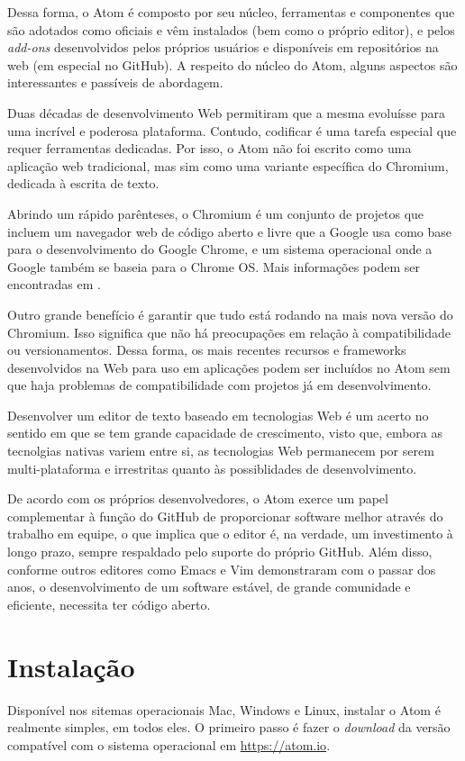 	Dessa forma, o Atom é composto por seu núcleo, ferramentas e componentes que são adotados como oficiais e vêm instalados (bem como o próprio editor), e pelos \textit{add-ons} desenvolvidos pelos próprios usuários e disponíveis em repositórios na web (em especial no GitHub). A respeito do núcleo do Atom, alguns aspectos são interessantes e passíveis de abordagem.

	Duas décadas de desenvolvimento Web permitiram que a mesma evoluísse para uma incrível e poderosa plataforma. Contudo, codificar é uma tarefa especial que requer ferramentas dedicadas. Por isso, o Atom não foi escrito como uma aplicação web tradicional, mas sim como uma variante específica do Chromium, dedicada à escrita de texto.

	Abrindo um rápido parênteses, o Chromium é um conjunto de projetos que incluem um navegador web de código aberto e livre que a Google usa como base para o desenvolvimento do Google Chrome, e um sistema operacional onde a Google também se baseia para o Chrome OS. Mais informações podem ser encontradas em \cite{doc:chromium}.

	Outro grande benefício é garantir que tudo está rodando na mais nova versão do Chromium. Isso significa que não há preocupações em relação à compatibilidade ou versionamentos. Dessa forma, os mais recentes recursos e frameworks desenvolvidos na Web para uso em aplicações podem ser incluídos no Atom sem que haja problemas de compatibilidade com projetos já em desenvolvimento.

	Desenvolver um editor de texto baseado em tecnologias Web é um acerto no sentido em que se tem grande capacidade de crescimento, visto que, embora as tecnolgias nativas variem entre si, as tecnologias Web permanecem por serem multi-plataforma e irrestritas quanto às possiblidades de desenvolvimento.

	De acordo com os próprios desenvolvedores, o Atom exerce um papel complementar à função do GitHub de proporcionar software melhor através do trabalho em equipe, o que implica que o editor é, na verdade, um investimento à longo prazo, sempre respaldado pelo suporte do próprio GitHub. Além disso, conforme outros editores como Emacs e Vim demonstraram com o passar dos anos, o desenvolvimento de um software estável, de grande comunidade e eficiente, necessita ter código aberto.

	\section{Instalação}\label{sec:inst}
	Disponível nos sitemas operacionais Mac, Windows e Linux, instalar o Atom é realmente simples, em todos eles. O primeiro passo é fazer o \textit{download} da versão compatível com o sistema operacional em \href{https://atom.io}{https://atom.io}.

